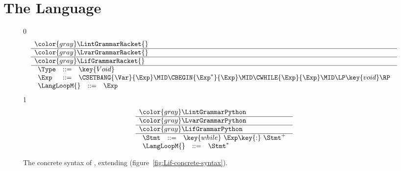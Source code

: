 \documentclass[7x10]{TimesAPriori_MIT}%
\newcommand{\gray}[1]{{\color{gray} #1}}
\def\racketEd{0}
\def\pythonEd{1}
\providecommand{\BookEdition}{1}
\let\edition\BookEdition
\newcommand{\pythonColor}[0]{}
\numberwithin{theorem}{chapter}
\numberwithin{definition}{chapter}
\numberwithin{equation}{chapter}
\begin{document}
\section{The \LangLoop{} Language}

\newcommand{\LwhileGrammarRacket}{
  \begin{array}{lcl}
   \Type &::=& \key{Void}\\
   \Exp &::=& \CSETBANG{\Var}{\Exp}
      \MID \CBEGIN{\Exp^{*}}{\Exp}
      \MID \CWHILE{\Exp}{\Exp} \MID \LP\key{void}\RP 
  \end{array}
}
\newcommand{\LwhileASTRacket}{
\begin{array}{lcl}
  \Type &::=& \key{Void}\\
  \Exp &::=& \SETBANG{\Var}{\Exp}
       \MID \BEGIN{\Exp^{*}}{\Exp}
       \MID \WHILE{\Exp}{\Exp}
       \MID \VOID{}  
\end{array}
}

\newcommand{\LwhileGrammarPython}{
\begin{array}{rcl}
  \Stmt &::=& \key{while}~ \Exp \key{:}~ \Stmt^{+}
\end{array}
}
\newcommand{\LwhileASTPython}{
\begin{array}{lcl}
\Stmt{} &::=& \WHILESTMT{\Exp}{\Stmt^{+}}
\end{array}
}

\begin{figure}[tp]
\centering
\begin{tcolorbox}[colback=white]
    \small
{\if\edition\racketEd    
\[
\begin{array}{l}
  \gray{\LintGrammarRacket{}} \\ \hline
  \gray{\LvarGrammarRacket{}} \\ \hline
  \gray{\LifGrammarRacket{}} \\ \hline
  \LwhileGrammarRacket \\
  \begin{array}{lcl}
  \LangLoopM{} &::=& \Exp
\end{array}
\end{array}
\]
\fi}
{\if\edition\pythonEd\pythonColor
\[
\begin{array}{l}
  \gray{\LintGrammarPython} \\ \hline
  \gray{\LvarGrammarPython}  \\ \hline
  \gray{\LifGrammarPython} \\ \hline
  \LwhileGrammarPython \\
\begin{array}{rcl}
  \LangLoopM{} &::=& \Stmt^{*}
\end{array}
\end{array}
\]
\fi}
\end{tcolorbox}

\caption{The concrete syntax of \LangLoop{}, extending \LangIf{} (figure~\ref{fig:Lif-concrete-syntax}).}
\label{fig:Lwhile-concrete-syntax}
\end{figure}
\end{document}
